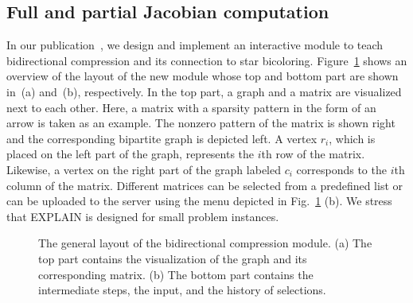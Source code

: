 \documentclass[12pt, twoside,a4paper,toc=bibliography]{scrbook}
\begin{document}
\subsection{Full and partial Jacobian computation}%
\label{s.bidirectional}
In our publication~\cite{2014:09}, we design and implement an interactive module to
teach bidirectional compression and its connection to star bicoloring.
Figure~\ref{f.explain} shows an overview of the layout of the new module whose top and
bottom part are shown in~(a) and~(b), respectively. In the top part, a graph and a matrix
are visualized next to each other. Here, a matrix with a sparsity pattern in the form of
an arrow is taken as an example. The nonzero pattern of the matrix is shown right and the
corresponding bipartite graph is depicted left. A vertex $r_i$, which is placed on the
left part of the graph, represents the $i$th row of the matrix. Likewise, a vertex on the
right part of the graph labeled $c_i$ corresponds to the $i$th column of the matrix.
Different matrices can be selected from a predefined list or can be uploaded to the
server using the menu depicted in Fig.~\ref{f.explain} (b). We stress that EXPLAIN is
designed for small problem instances.

\begin{figure}
\centering
{}
\hfill
{}
\caption{The general layout of the bidirectional compression module. (a) The top part
contains the visualization of the graph and its corresponding matrix. (b)
The bottom part contains the intermediate steps, the input, and the
history of selections.}
\label{f.explain}
\end{figure}
\end{document}
